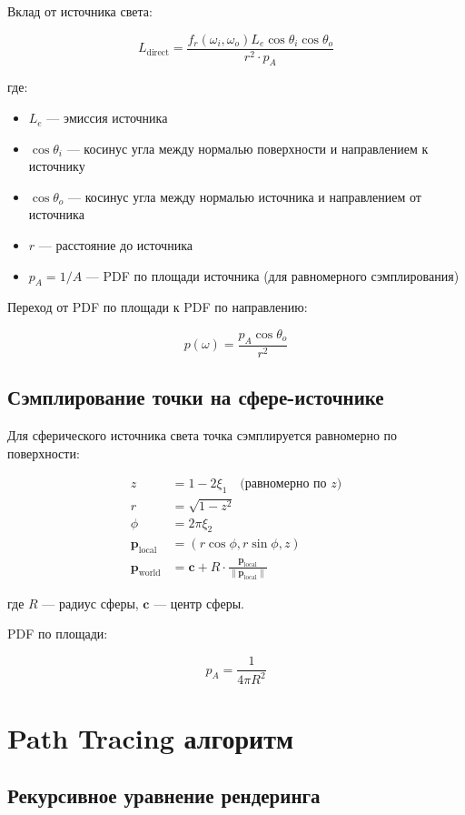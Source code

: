 \documentclass[14pt, a4paper]{extarticle}
\begin{document}
Вклад от источника света:

\[
L_{\text{direct}} = \frac{f_r(\omega_i, \omega_o) L_e \cos\theta_i \cos\theta_o}{r^2 \cdot p_A}
\]

где:
\begin{itemize}
    \item $L_e$ --- эмиссия источника
    \item $\cos\theta_i$ --- косинус угла между нормалью поверхности и направлением к источнику
    \item $\cos\theta_o$ --- косинус угла между нормалью источника и направлением от источника
    \item $r$ --- расстояние до источника
    \item $p_A = 1/A$ --- PDF по площади источника (для равномерного сэмплирования)
\end{itemize}

Переход от PDF по площади к PDF по направлению:

\[
p(\omega) = \frac{p_A \cos\theta_o}{r^2}
\]

\subsection{Сэмплирование точки на сфере-источнике}

Для сферического источника света точка сэмплируется равномерно по поверхности:

\begin{align}
z &= 1 - 2\xi_1 \quad \text{(равномерно по } z \text{)} \\
r &= \sqrt{1 - z^2} \\
\phi &= 2\pi \xi_2 \\
\mathbf{p}_{\text{local}} &= (r\cos\phi, r\sin\phi, z) \\
\mathbf{p}_{\text{world}} &= \mathbf{c} + R \cdot \frac{\mathbf{p}_{\text{local}}}{\|\mathbf{p}_{\text{local}}\|}
\end{align}

где $R$ --- радиус сферы, $\mathbf{c}$ --- центр сферы.

PDF по площади:

\[
p_A = \frac{1}{4\pi R^2}
\]

\section{Path Tracing алгоритм}

\subsection{Рекурсивное уравнение рендеринга}
\end{document}
